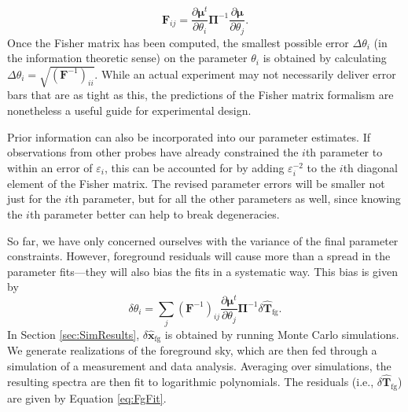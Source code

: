 \documentclass[twocolumn,apj,numberedappendix]{emulateapj}
\newcommand{\xhat}{\hat{\mathbf{x}}}
\newcommand{\F}{\mathbf{F}}
\begin{document}
\begin{equation}
\F_{ij} = \frac{\partial \boldsymbol \mu ^t}{\partial \theta_i} \boldsymbol \Pi ^{-1} \frac{\partial \boldsymbol \mu}{\partial \theta_j}.
\end{equation}
Once the Fisher matrix has been computed, the smallest possible error $\Delta \theta_i$ (in the information theoretic sense) on the parameter $\theta_i$ is obtained by calculating $\Delta \theta_i = \sqrt{(\F^{-1})_{ii}}$. While an actual experiment may not necessarily deliver error bars that are as tight as this, the predictions of the Fisher matrix formalism are nonetheless a useful guide for experimental design.

Prior information can also be incorporated into our parameter estimates. If observations from other probes have already constrained the $i$th parameter to within an error of $\varepsilon_i$, this can be accounted for by adding $\varepsilon_i^{-2}$ to the $i$th diagonal element of the Fisher matrix. The revised parameter errors will be smaller not just for the $i$th parameter, but for all the other parameters as well, since knowing the $i$th parameter better can help to break degeneracies. 


So far, we have only concerned ourselves with the variance of the final parameter constraints. However, foreground residuals will cause more than a spread in the parameter fits---they will also bias the fits in a systematic way. This bias is given by
\begin{equation}
\delta \theta_i = \sum_{j} (\F^{-1})_{ij} \frac{\partial \boldsymbol \mu ^t}{\partial \theta_j} \boldsymbol \Pi ^{-1} \delta \widehat{\mathbf{T}}_\textrm{fg}.
\end{equation}
In Section \ref{sec:SimResults}, $\delta \xhat_\textrm{fg}$ is obtained by running Monte Carlo simulations. We generate realizations of the foreground sky, which are then fed through a simulation of a measurement and data analysis. Averaging over simulations, the resulting spectra are then fit to logarithmic polynomials. The residuals (i.e., $\delta \widehat{\mathbf{T}}_\textrm{fg}$) are given by Equation \eqref{eq:FgFit}.
\end{document}

